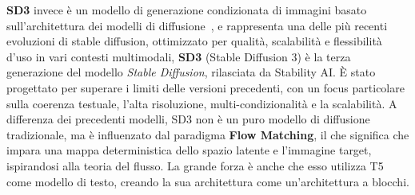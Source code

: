 \textbf{SD3} invece è un modello di generazione condizionata di immagini basato sull'architettura dei modelli di diffusione~\cite{stablediffusion3}, e rappresenta una delle più recenti evoluzioni di stable diffusion, ottimizzato per qualità, scalabilità e flessibilità d'uso in vari contesti multimodali, \textbf{SD3} (Stable Diffusion 3) è la terza generazione del modello \textit{Stable Diffusion}, rilasciata da Stability AI. È stato progettato per superare i limiti delle versioni precedenti, con un focus particolare sulla coerenza testuale, l'alta risoluzione, multi-condizionalità e la scalabilità. A differenza dei precedenti modelli, SD3 non è un puro modello di diffusione tradizionale, ma è influenzato dal paradigma \textbf{Flow Matching}, il che significa che impara una mappa deterministica dello spazio latente e l'immagine target, ispirandosi alla teoria del flusso. La grande forza è anche che esso utilizza T5 come modello di testo, creando la sua architettura come un'architettura a blocchi.
\vspace{0.8cm}
